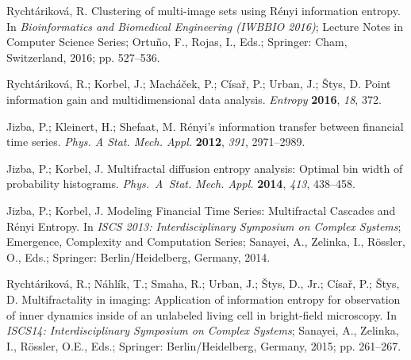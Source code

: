 \documentclass[entropy,article,accept,moreauthors,pdftex,10pt,a4paper]{mdpi}
\begin{document}




\begin{thebibliography}{00}
 Rycht\'{a}rikov\'{a}, R. Clustering of multi-image sets using R\'{e}nyi information entropy. In \textit{Bioinformatics and Biomedical Engineering (IWBBIO 2016)}; Lecture Notes in Computer Science Series; Ortu\~{n}o, F., Rojas, I., Eds.; Springer: Cham, Switzerland, 2016; pp. 527--536.

 Rycht\'{a}rikov\'{a}, R.; Korbel, J.; Mach\'{a}\v{c}ek, P.; C\'{i}sa\v{r}, P.; Urban, J.; \v{S}tys, D. Point information gain and multidimensional data analysis. \textit{Entropy} \textbf{2016}, \textit{18}, 372.%

 Jizba, P.; Kleinert, H.; Shefaat, M. R\'{e}nyi's information transfer between financial time series. \textit{Phys. A Stat. Mech. Appl.} \textbf{2012}, \textit{391}, 2971--2989.

 Jizba, P.; Korbel, J. Multifractal diffusion entropy analysis: Optimal bin width of
probability histograms. \textit{Phys.~A~Stat. Mech. Appl.} \textbf{2014}, \textit{413}, 438--458.%

 Jizba, P.; Korbel, J. Modeling Financial Time Series: Multifractal Cascades and Rényi Entropy. In  \emph{ISCS 2013: Interdisciplinary Symposium on Complex Systems};  Emergence, Complexity and Computation Series; Sanayei, A., Zelinka, I., Rössler, O., Eds.;  Springer: Berlin/Heidelberg, Germany, 2014.

 Rycht\'{a}rikov\'{a}, R.; N\'{a}hl\'{i}k, T.; Smaha, R.; Urban, J.; \v{S}tys, D., Jr.; C\'{i}sa\v{r}, P.; \v{S}tys, D. Multifractality in imaging: Application of information entropy for observation of inner dynamics inside of an unlabeled living cell in bright-field microscopy. In \textit{ISCS14: Interdisciplinary Symposium on Complex Systems}; Sanayei, A., Zelinka, I., R\"{o}ssler, O.E., Eds.; Springer: Berlin/Heidelberg, Germany, 2015; pp. 261--267.


\end{thebibliography}
\end{document}
